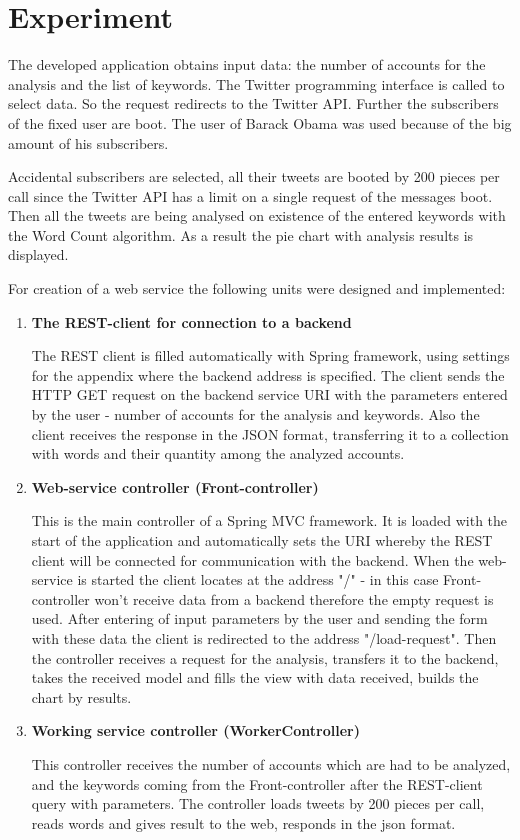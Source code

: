 \section{Experiment}\label{sec:definition}

The developed application obtains input data: the number of accounts for the analysis and the list of keywords. The Twitter programming interface is called to select data. So the request redirects to the Twitter API. Further the subscribers of the fixed user are boot. The user of Barack Obama was used because of the big amount of his subscribers. 

Accidental subscribers are selected, all their tweets are booted by 200 pieces per call since the Twitter API has a limit on a single request of the messages boot. Then all the tweets are being analysed on existence of the entered keywords with the Word Count algorithm. As a result the pie chart with analysis results is displayed.

For creation of a web service the following units were designed and implemented:

\begin {enumerate}
\item \textbf{The REST-client for connection to a backend}

The REST client is filled automatically with Spring framework, using settings for the appendix where the backend address is specified. The client sends the HTTP GET request on the backend service URI with the parameters entered by the user - number of accounts for the analysis and keywords. Also the client receives the response in the JSON format, transferring it to a collection with words and their quantity among the analyzed accounts.
\item \textbf{Web-service controller (Front-controller)}

This is the main controller of a Spring MVC framework. It is loaded with the start of the application and automatically sets the URI whereby the REST client will be connected for communication with the backend. When the web-service is started the client locates at the address "/" - in this case Front-controller won't receive data from a backend therefore the empty request is used. After entering of input parameters by the user and sending the form with these data the client is redirected to the address "/load-request". Then the controller receives a request for the analysis, transfers it to the backend, takes the received model and fills the view with data received, builds the chart by results.
\item \textbf{Working service controller (WorkerController)}

This controller receives the number of accounts which are had to be analyzed, and the keywords coming from the Front-controller after the REST-client query with parameters. The controller loads tweets by 200 pieces per call, reads words and gives result to the web, responds in the json format.
\end {enumerate}

